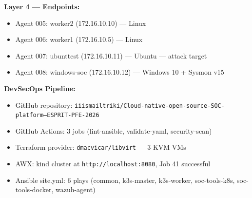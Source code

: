 \documentclass[12pt,a4paper]{report}
\begin{document}
\textbf{Layer 4 --- Endpoints:}
\begin{itemize}
  \item Agent 005: worker2 (172.16.10.10) --- Linux
  \item Agent 006: worker1 (172.16.10.5) --- Linux
  \item Agent 007: ubunttest (172.16.10.11) --- Ubuntu --- attack target
  \item Agent 008: windows-soc (172.16.10.12) --- Windows 10 + Sysmon v15
\end{itemize}

\textbf{DevSecOps Pipeline:}
\begin{itemize}
  \item GitHub repository: \texttt{iiismailtriki/Cloud-native-open-source-SOC-platform---ESPRIT-PFE-2026}
  \item GitHub Actions: 3 jobs (lint-ansible, validate-yaml, security-scan)
  \item Terraform provider: \texttt{dmacvicar/libvirt} --- 3 KVM VMs
  \item AWX: kind cluster at \texttt{http://localhost:8080}, Job 41 successful
  \item Ansible site.yml: 6 plays (common, k3s-master, k3s-worker, soc-tools-k8s, soc-tools-docker, wazuh-agent)
\end{itemize}
\clearpage

\end{document}
